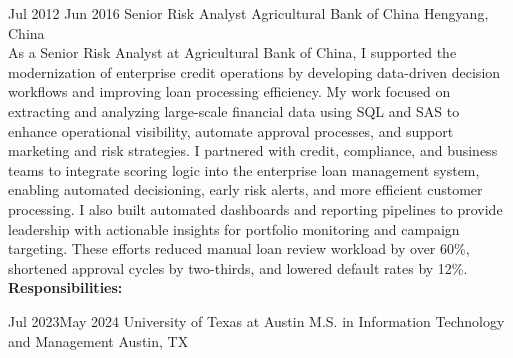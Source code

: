 {
{Jul 2012}
{Jun 2016}
{Senior Risk Analyst}
{Agricultural Bank of China}
{Hengyang, China}
{\smallskip
\\As a Senior Risk Analyst at Agricultural Bank of China, I supported the modernization of enterprise credit operations by developing data-driven decision workflows and improving loan processing efficiency. My work focused on extracting and analyzing large-scale financial data using SQL and SAS to enhance operational visibility, automate approval processes, and support marketing and risk strategies.
I partnered with credit, compliance, and business teams to integrate scoring logic into the enterprise loan management system, enabling automated decisioning, early risk alerts, and more efficient customer processing. I also built automated dashboards and reporting pipelines to provide leadership with actionable insights for portfolio monitoring and campaign targeting. These efforts reduced manual loan review workload by over 60\%, shortened approval cycles by two-thirds, and lowered default rates by 12\%.\\
\textbf{Responsibilities:} 
\jbegin
\jend
}

{Jul 2023}{May 2024}
{University of Texas at Austin}
{M.S. in Information Technology and Management}
{Austin, TX}

}

